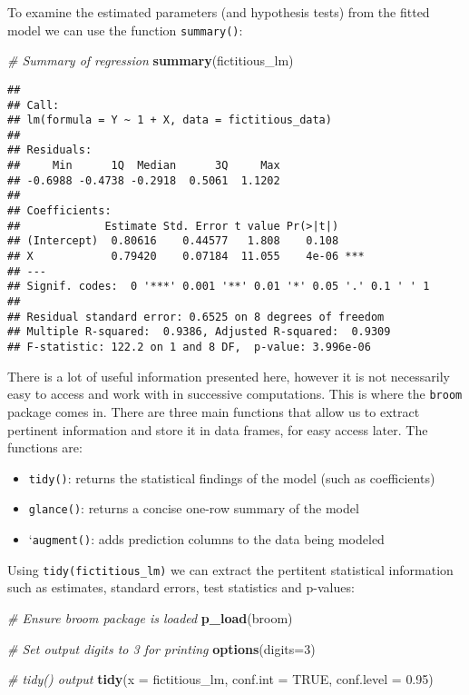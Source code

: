 \documentclass[
]{book}
\newenvironment{Shaded}{\begin{snugshade}}{\end{snugshade}}
\newcommand{\CommentTok}[1]{\textcolor[rgb]{0.56,0.35,0.01}{\textit{#1}}}
\newcommand{\DataTypeTok}[1]{\textcolor[rgb]{0.13,0.29,0.53}{#1}}
\newcommand{\DecValTok}[1]{\textcolor[rgb]{0.00,0.00,0.81}{#1}}
\newcommand{\FloatTok}[1]{\textcolor[rgb]{0.00,0.00,0.81}{#1}}
\newcommand{\KeywordTok}[1]{\textcolor[rgb]{0.13,0.29,0.53}{\textbf{#1}}}
\newcommand{\NormalTok}[1]{#1}
\newcommand{\OtherTok}[1]{\textcolor[rgb]{0.56,0.35,0.01}{#1}}
\providecommand{\tightlist}{%
  \setlength{\itemsep}{0pt}\setlength{\parskip}{0pt}}
\begin{document}
To examine the estimated parameters (and hypothesis tests) from the fitted model we can use the function \texttt{summary()}:

\begin{Shaded}
\begin{Highlighting}[]
\CommentTok{# Summary of regression }
\KeywordTok{summary}\NormalTok{(fictitious_lm)}
\end{Highlighting}
\end{Shaded}

\begin{verbatim}
## 
## Call:
## lm(formula = Y ~ 1 + X, data = fictitious_data)
## 
## Residuals:
##     Min      1Q  Median      3Q     Max 
## -0.6988 -0.4738 -0.2918  0.5061  1.1202 
## 
## Coefficients:
##             Estimate Std. Error t value Pr(>|t|)    
## (Intercept)  0.80616    0.44577   1.808    0.108    
## X            0.79420    0.07184  11.055    4e-06 ***
## ---
## Signif. codes:  0 '***' 0.001 '**' 0.01 '*' 0.05 '.' 0.1 ' ' 1
## 
## Residual standard error: 0.6525 on 8 degrees of freedom
## Multiple R-squared:  0.9386, Adjusted R-squared:  0.9309 
## F-statistic: 122.2 on 1 and 8 DF,  p-value: 3.996e-06
\end{verbatim}

There is a lot of useful information presented here, however it is not necessarily easy to access and work with in successive computations. This is where the \texttt{broom} package comes in. There are three main functions that allow us to extract pertinent information and store it in data frames, for easy access later. The functions are:

\begin{itemize}
\tightlist
\item
  \texttt{tidy()}: returns the statistical findings of the model (such as coefficients)
\item
  \texttt{glance()}: returns a concise one-row summary of the model
\item
  `\texttt{augment()}: adds prediction columns to the data being modeled
\end{itemize}

Using \texttt{tidy(fictitious\_lm)} we can extract the pertitent statistical information such as estimates, standard errors, test statistics and p-values:

\begin{Shaded}
\begin{Highlighting}[]
\CommentTok{# Ensure broom package is loaded}
\KeywordTok{p_load}\NormalTok{(broom)}

\CommentTok{# Set output digits to 3 for printing}
\KeywordTok{options}\NormalTok{(}\DataTypeTok{digits=}\DecValTok{3}\NormalTok{)}

\CommentTok{# tidy() output}
\KeywordTok{tidy}\NormalTok{(}\DataTypeTok{x =}\NormalTok{ fictitious_lm,}
     \DataTypeTok{conf.int =} \OtherTok{TRUE}\NormalTok{,}
     \DataTypeTok{conf.level =} \FloatTok{0.95}\NormalTok{)}
\end{Highlighting}
\end{Shaded}
\end{document}
